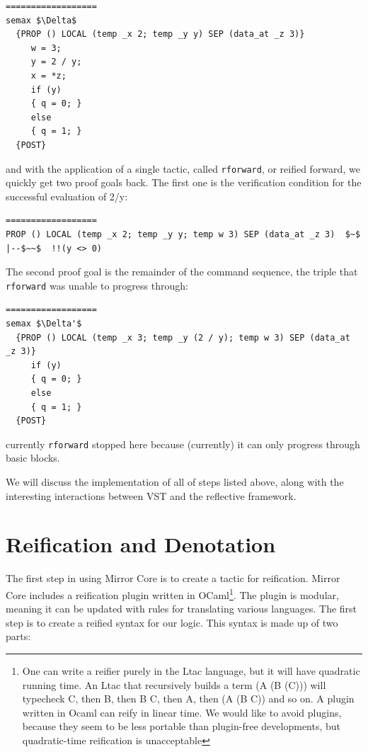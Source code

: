\documentclass{puthesis}
\begin{document}
\begin{lstlisting}
==================
semax $\Delta$ 
  {PROP () LOCAL (temp _x 2; temp _y y) SEP (data_at _z 3)} 
     w = 3;
     y = 2 / y; 
     x = *z;
     if (y) 
     { q = 0; }
     else
     { q = 1; }
  {POST}
\end{lstlisting}

and with the application of a single tactic, called
\lstinline|rforward|, or reified forward, we quickly get two proof
goals back.  The first one is the verification condition for the
successful evaluation of 2/y:

\begin{lstlisting}
================== 
PROP () LOCAL (temp _x 2; temp _y y; temp w 3) SEP (data_at _z 3)  $~$ |--$~~$  !!(y <> 0) 
\end{lstlisting}

The second proof goal is the remainder of the command sequence, the
triple that \lstinline|rforward| was unable to progress through:

 
\begin{lstlisting}
==================
semax $\Delta'$ 
  {PROP () LOCAL (temp _x 3; temp _y (2 / y); temp w 3) SEP (data_at _z 3)} 
     if (y) 
     { q = 0; }
     else
     { q = 1; }
  {POST}
\end{lstlisting}
\noindent currently \lstinline|rforward| stopped here because
(currently) it can only progress through basic blocks.

We will discuss the implementation of all of steps listed above, along
with the interesting interactions between VST and the reflective
framework.

\section{Reification and Denotation}
\label{sec:reification}
The first step in using Mirror Core is to create a tactic for
reification. Mirror Core includes a reification plugin written in
OCaml\footnote{One can write a reifier purely in the Ltac language,
  but it will have quadratic running time. An Ltac that recursively
  builds a term (A (B (C))) will typecheck C, then B, then B C, then
  A, then (A (B C)) and so on. A plugin written in Ocaml can reify in
  linear time.  We would like to avoid plugins, because they seem to
  be less portable than plugin-free developments, but quadratic-time
  reification is unacceptable}.  The plugin is modular, meaning it
can be updated with rules for translating various languages. The first
step is to create a reified syntax for our logic. This syntax is made
up of two parts:
\end{document}
